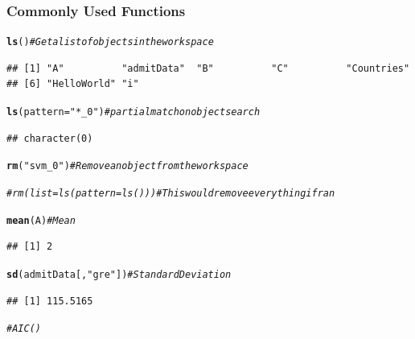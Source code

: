 \documentclass{beamer}\usepackage[]{graphicx}\usepackage[]{color}
\makeatletter
\newcommand{\hlstr}[1]{\textcolor[rgb]{0.192,0.494,0.8}{#1}}%
\newcommand{\hlcom}[1]{\textcolor[rgb]{0.678,0.584,0.686}{\textit{#1}}}%
\newcommand{\hlstd}[1]{\textcolor[rgb]{0.345,0.345,0.345}{#1}}%
\newcommand{\hlkwc}[1]{\textcolor[rgb]{0.333,0.667,0.333}{#1}}%
\newcommand{\hlkwd}[1]{\textcolor[rgb]{0.737,0.353,0.396}{\textbf{#1}}}%
\newenvironment{kframe}{%
 \def\at@end@of@kframe{}%
 \ifinner\ifhmode%
  \def\at@end@of@kframe{\end{minipage}}%
  \begin{minipage}{\columnwidth}%
 \fi\fi%
 \def\FrameCommand##1{\hskip\@totalleftmargin \hskip-\fboxsep
 \colorbox{shadecolor}{##1}\hskip-\fboxsep
     \hskip-\linewidth \hskip-\@totalleftmargin \hskip\columnwidth}%
 \MakeFramed {\advance\hsize-\width
   \@totalleftmargin\z@ \linewidth\hsize
   \@setminipage}}%
 {\par\unskip\endMakeFramed%
 \at@end@of@kframe}
\newenvironment{knitrout}{}{} %
\makeatother
\begin{document}
\begin{frame}
\frametitle{Commonly Used Functions}
\begin{knitrout}\scriptsize
{}\color{fgcolor}\begin{kframe}
\begin{alltt}
\hlkwd{ls}\hlstd{()}  \hlcom{# Get a list of objects in the workspace}
\end{alltt}
\begin{verbatim}
## [1] "A"          "admitData"  "B"          "C"          "Countries" 
## [6] "HelloWorld" "i"
\end{verbatim}
\begin{alltt}
\hlkwd{ls}\hlstd{(}\hlkwc{pattern} \hlstd{=} \hlstr{"*_0"}\hlstd{)}  \hlcom{# partial match on object search}
\end{alltt}
\begin{verbatim}
## character(0)
\end{verbatim}
\begin{alltt}
\hlkwd{rm}\hlstd{(}\hlstr{"svm_0"}\hlstd{)}  \hlcom{# Remove an object from the workspace}
\end{alltt}


{\ttfamily\noindent{}}\begin{alltt}
\hlcom{# rm(list=ls(pattern=ls())) # This would remove everything if ran}
\end{alltt}
\end{kframe}
\end{knitrout}


\begin{knitrout}\scriptsize
{}\color{fgcolor}\begin{kframe}
\begin{alltt}
\hlkwd{mean}\hlstd{(A)}  \hlcom{# Mean}
\end{alltt}
\begin{verbatim}
## [1] 2
\end{verbatim}
\begin{alltt}
\hlkwd{sd}\hlstd{(admitData[,} \hlstr{"gre"}\hlstd{])}  \hlcom{# Standard Deviation}
\end{alltt}
\begin{verbatim}
## [1] 115.5165
\end{verbatim}
\begin{alltt}
\hlcom{# AIC()}
\end{alltt}
\end{kframe}
\end{knitrout}




\end{frame}
\end{document}
